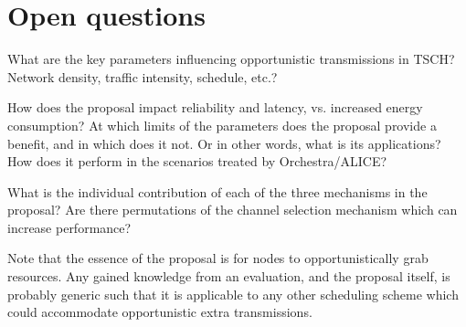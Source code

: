 \documentclass[journal,comsoc]{IEEEtran}
\begin{document}
\section{Open questions}
What are the key parameters influencing opportunistic transmissions in TSCH? Network density, traffic intensity, schedule, etc.?

How does the proposal impact reliability and latency, vs. increased energy consumption? At which limits of the parameters does the proposal provide a benefit, and in which does it not. Or in other words, what is its applications? How does it perform in the scenarios treated by Orchestra/ALICE?

What is the individual contribution of each of the three mechanisms in the proposal? Are there permutations of the channel selection mechanism which can increase performance?


Note that the essence of the proposal is for nodes to opportunistically grab resources. Any gained knowledge from an evaluation, and the proposal itself, is probably generic such that it is applicable to any other scheduling scheme which could accommodate opportunistic extra transmissions.



%
%
\end{document}
